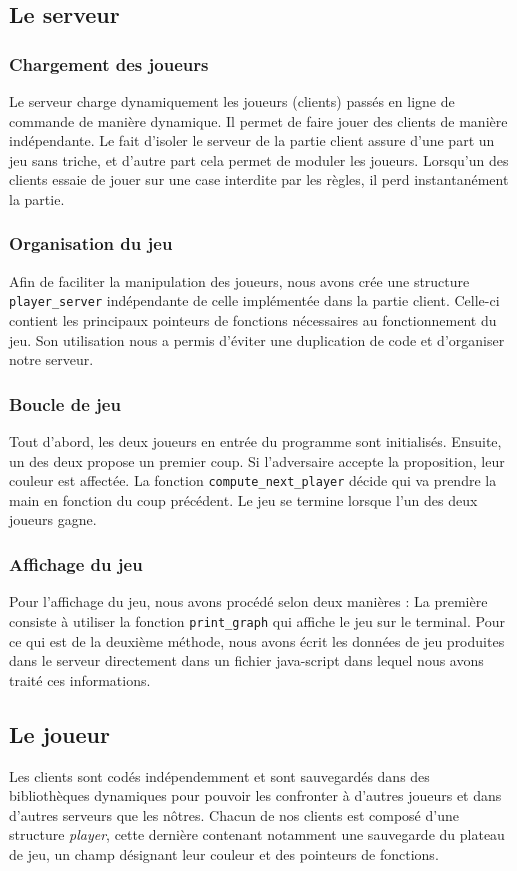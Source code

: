 \documentclass{article}
\begin{document}
\subsection{Le serveur}
\subsubsection{Chargement des joueurs}
Le serveur charge dynamiquement les joueurs (clients) passés en ligne de commande de manière dynamique. Il permet de faire jouer des clients de manière indépendante. Le fait d'isoler le serveur de la partie client assure d'une part un jeu sans triche, et d'autre part cela permet de moduler les joueurs. Lorsqu'un des clients essaie de jouer sur une case interdite par les règles, il perd instantanément la partie. 
\subsubsection{Organisation du jeu}

 Afin de faciliter la manipulation des joueurs, nous avons crée une structure \lstinline{player_server} indépendante de celle implémentée dans la partie client. Celle-ci contient les principaux pointeurs de fonctions nécessaires au fonctionnement du jeu. Son utilisation nous a permis d'éviter une duplication de code et d'organiser notre serveur. 
 \subsubsection{Boucle de jeu}
 Tout d'abord, les deux joueurs en entrée du programme sont initialisés. Ensuite, un des deux propose un premier coup. Si l'adversaire accepte la proposition, leur couleur est affectée. La fonction \lstinline{compute_next_player} décide qui va prendre la main en fonction du coup précédent. Le jeu se termine lorsque l'un des deux joueurs gagne.
 \subsubsection{Affichage du jeu}

 Pour l'affichage du jeu, nous avons procédé selon deux manières : La première consiste à utiliser la fonction \lstinline{print_graph} qui affiche le jeu sur le terminal. Pour ce qui est de la deuxième méthode, nous avons écrit les données de jeu produites dans le serveur directement dans un fichier java-script dans lequel nous avons traité ces informations.


\subsection{Le joueur}
Les clients sont codés indépendemment et sont sauvegardés dans des bibliothèques dynamiques pour pouvoir les confronter à d'autres joueurs et dans d'autres serveurs que les nôtres. Chacun de nos clients est composé d'une structure \textit{player}, cette dernière contenant notamment une sauvegarde du plateau de jeu, un champ désignant leur couleur et des pointeurs de fonctions.
\end{document}
